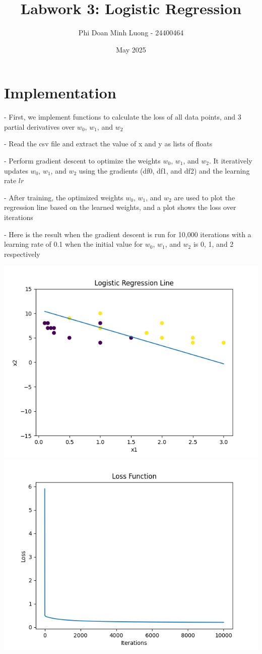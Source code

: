 \documentclass{article}
\title{Labwork 3: Logistic Regression}
\author{Phi Doan Minh Luong - 24400464}
\date{May 2025}
\begin{document}
\maketitle

\setlength\parindent{0pt}

\section{Implementation}
- First, we implement functions to calculate the loss of all data points, and 3 partial derivatives over $w_0$, $w_1$, and $w_2$

- Read the csv file and extract the value of x and y as lists of floats

- Perform gradient descent to optimize the weights $w_0$, $w_1$, and $w_2$. It iteratively updates $w_0$, $w_1$, and $w_2$ using the gradients (df0, df1, and df2) and the learning rate $lr$

- After training, the optimized weights $w_0$, $w_1$, and $w_2$ are used to plot the regression line based on the learned weights, and a plot shows the loss over iterations

- Here is the result when the gradient descent is run for 10,000 iterations with a learning rate of 0.1 when the initial value for $w_0$, $w_1$, and $w_2$ is 0, 1, and 2 respectively
\begin{center}
    \includegraphics[width=0.5\linewidth]{1.png}
    \includegraphics[width=0.5\linewidth]{2.png}
\end{center}
\end{document}

